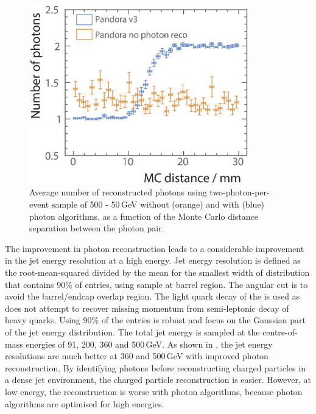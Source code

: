 \begin{figure}[tbph]
\centering
\includegraphics[width=0.85\textwidth]{photon/nPhotonVSnoPhotonReco2}
\caption[Average number of photons using two photons of 500 and 50\,GeV per event sample.]
{Average number of reconstructed  photons using two-photon-per-event sample of 500 - 50\,GeV without (orange) and with (blue) photon algorithms, as a function of the Monte Carlo distance separation between the photon pair.}
\label{fig:photonDoublePerformanceNoReco}
\end{figure}




The improvement in photon reconstruction leads to a considerable improvement in the jet energy resolution at a high energy. Jet energy resolution is defined as the root-mean-squared divided by the mean for the smallest width of distribution that contains 90\% of entries, using \eeZuds sample at barrel region. The angular cut is to avoid the barrel/endcap overlap region. The light quark decay of the \Zprime is used as \pandora does not attempt to recover missing momentum from semi-leptonic decay of heavy quarks. Using 90\% of the entries is robust and focus on the Gaussian part of the jet energy distribution. The total jet energy is sampled at the centre-of-mass energies of 91, 200, 360 and 500\,GeV. As shown in , the jet energy resolutions are much better at 360 and 500\,GeV with improved photon reconstruction. By identifying photons before reconstructing charged particles in a dense jet environment, the charged particle reconstruction is easier. However, at low energy, the reconstruction is worse with photon algorithms, because photon algorithms are optimised for high energies.

